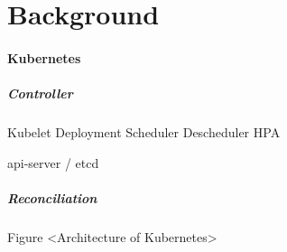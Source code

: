\section{Background}
\label{sec:background}

\paragraph*{Kubernetes}
\subparagraph*{Controller}
Kubelet
Deployment
Scheduler
Descheduler
HPA


api-server / etcd

\subparagraph*{Reconciliation}

Figure <Architecture of Kubernetes>


